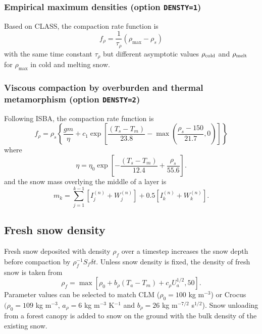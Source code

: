 \documentclass{article}
\begin{document}
\subsubsection{Empirical maximum densities (option {\tt DENSTY=1})}

Based on CLASS, the compaction rate function is
\begin{equation}
f_\rho = \frac{1}{\tau_\rho}(\rho_{\max} - \rho_s)
\end{equation}
with the same time constant $\tau_\rho$ but different asymptotic values $\rho_{\rm cold}$ and $\rho_{\rm melt}$ for $\rho_{\max}$ in cold and melting snow.

\subsubsection{Viscous compaction by overburden and thermal metamorphism (option {\tt DENSTY=2})}

Following ISBA, the compaction rate function is
\begin{equation}
f_\rho = \rho_s\left\{\frac{gm}{\eta} + c_1 \exp\left[\frac{(T_s - T_m)}{23.8} 
                - \max\left(\frac{\rho_s - 150}{21.7}, 0\right)\right]\right\}
\end{equation}
where
\begin{equation}
\eta = \eta_0\exp\left[-\frac{(T_s - T_m)}{12.4} + \frac{\rho_s}{55.6}\right].
\end{equation}
and the snow mass overlying the middle of a layer is
\begin{equation}
m_k = \sum_{j=1}^{k-1}\left[I_j^{(n)} + W_j^{(n)}\right] + 0.5\left[I_k^{(n)} + W_k^{(n)}\right].
\end{equation}

\subsection{Fresh snow density}

Fresh snow deposited with density $\rho_f$ over a timestep increases the snow depth before compaction by $\rho_f^{-1}S_f\delta t$. Unless snow density is fixed, the density of fresh snow is taken from
\begin{equation}
\rho_f = \max[\rho_0 + b_\rho (T_a - T_m) + c_\rho U_a^{1/2}, 50].
\end{equation}
Parameter values can be selected to match CLM ($\rho_0=100$ kg m$^{-3}$) or Crocus $(\rho_0=109$ kg m$^{-3}$, $a_\rho=6$ kg m$^{-3}$ K$^{-1}$ and $b_\rho=26$ kg m$^{-7/2}$ s$^{1/2}$). Snow unloading from a forest canopy is added to snow on the ground with the bulk density of the existing snow. 
\end{document}
